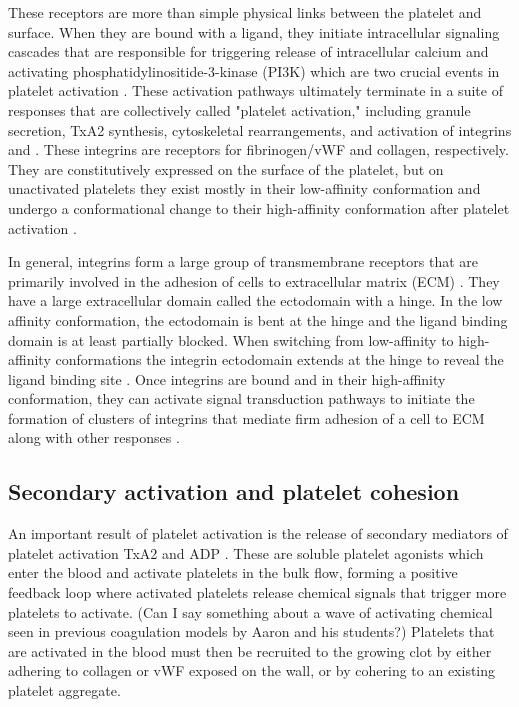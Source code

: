 These receptors are more than simple physical links between the
platelet and surface. When they are bound with a ligand, they initiate
intracellular signaling cascades that are responsible for triggering
release of intracellular calcium and activating
phosphatidylinositide-3-kinase (PI3K) which are two crucial events in
platelet activation \cite{Bye2016,Du2007,Senis2014}. These activation
pathways ultimately terminate in a suite of responses that are
collectively called "platelet activation," including granule
secretion, TxA2 synthesis, cytoskeletal rearrangements, and activation
of integrins  and . These integrins are
receptors for fibrinogen/vWF and collagen, respectively. They are
constitutively expressed on the surface of the platelet, but on
unactivated platelets they exist mostly in their low-affinity
conformation and undergo a conformational change to their
high-affinity conformation after platelet activation
\cite{Qiu2015,Shattil1998,Shattil2010}.
		
In general, integrins form a large group of transmembrane receptors
that are primarily involved in the adhesion of cells to extracellular
matrix (ECM) \cite{Giancotti1999}. They have a large extracellular
domain called the ectodomain with a hinge. In the low affinity
conformation, the ectodomain is bent at the hinge and the ligand
binding domain is at least partially blocked. When switching from
low-affinity to high-affinity conformations the integrin ectodomain
extends at the hinge to reveal the ligand binding site
\cite{Campbell2011,Qiu2015,Shattil1998}. Once integrins are bound and
in their high-affinity conformation, they can activate signal
transduction pathways to initiate the formation of clusters of
integrins that mediate firm adhesion of a cell to ECM along with other
responses \cite{Hynes2002,Li2010,Shattil1998,Shattil2010}.

\subsection{Secondary activation and platelet cohesion}
\label{sec:second-wave-activ}

An important result of platelet activation is the release of secondary
mediators of platelet activation TxA2 and ADP \cite{Bye2016}. These
are soluble platelet agonists which enter the blood and activate
platelets in the bulk flow, forming a positive feedback loop where
activated platelets release chemical signals that trigger more
platelets to activate. (Can I say something about a wave of activating
chemical seen in previous coagulation models by Aaron and his
students?) Platelets that are activated in the blood must
then be recruited to the growing clot by either adhering to collagen
or vWF exposed on the wall, or by cohering to an existing platelet
aggregate. 

